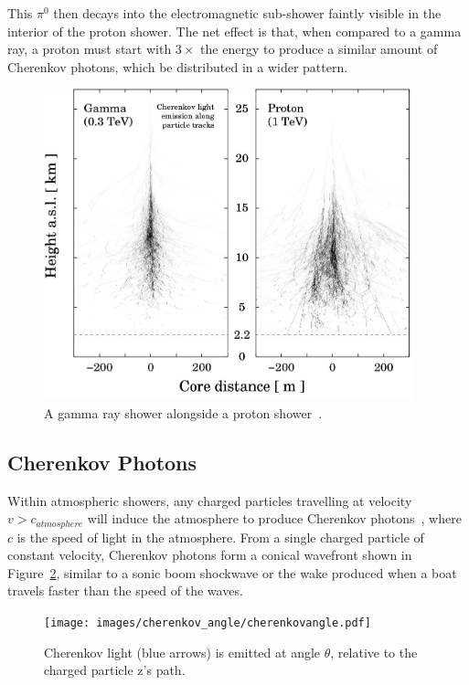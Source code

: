   This $\pi^{0}$ then decays into the electromagnetic sub-shower faintly visible in the interior of the proton shower.
  The net effect is that, when compared to a gamma ray, a proton must start with $3\times$ the energy to produce a similar amount of Cherenkov photons, which be distributed in a wider pattern.

  \begin{figure}[ht]
    \centering
    \includegraphics[width=0.95\textwidth]{images/showers_gamma_proton}
    \caption[Gamma Ray and Proton Showers]{
      A gamma ray shower alongside a proton shower~\cite{Bernlohr2008149}.
    }
    \label{fig:gamma_vs_proton_airshower}
  \end{figure}
  
  \FloatBarrier

  \subsection{Cherenkov Photons}\label{sec:cherenkov}

  Within atmospheric showers, any charged particles travelling at velocity $v > c_{atmosphere}$ will induce the atmosphere to produce Cherenkov photons~\cite{cherenkov}, where $c$ is the speed of light in the atmosphere.
  From a single charged particle of constant velocity, Cherenkov photons form a conical wavefront shown in Figure~\ref{fig:cherenkovangle}, similar to a sonic boom shockwave or the wake produced when a boat travels faster than the speed of the waves.

  \begin{figure}[ht]
    \centering
    \texttt{[image: images/cherenkov\_angle/cherenkovangle.pdf]}
    \caption[Chernekov Emission Angle]{
      Cherenkov light (blue arrows) is emitted at angle $\theta$, relative to the charged particle z's path.
    }
    \label{fig:cherenkovangle}
  \end{figure}

